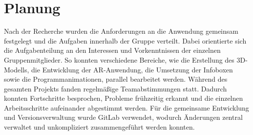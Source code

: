 \section{Planung}
Nach der Recherche wurden die Anforderungen an die Anwendung gemeinsam festgelegt und die Aufgaben innerhalb der Gruppe verteilt. Dabei orientierte sich die Aufgabenteilung an den Interessen und Vorkenntnissen der einzelnen Gruppenmitglieder. So konnten verschiedene Bereiche, wie die Erstellung des 3D-Modells, die Entwicklung der AR-Anwendung, die Umsetzung der Infoboxen sowie die Programmanimationen, parallel bearbeitet werden. Während des gesamten Projekts fanden regelmäßige Teamabstimmungen statt. Dadurch konnten Fortschritte besprochen, Probleme frühzeitig erkannt und die einzelnen Arbeitsschritte aufeinander abgestimmt werden. Für die gemeinsame Entwicklung und Versionsverwaltung wurde GitLab verwendet, wodurch Änderungen zentral verwaltet und unkompliziert zusammengeführt werden konnten.

